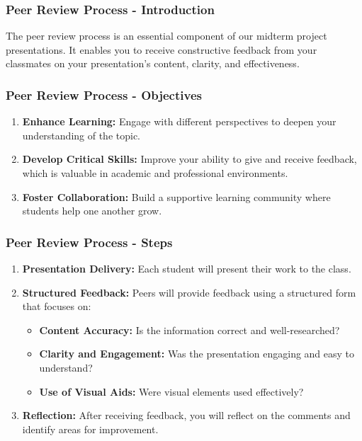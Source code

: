 \documentclass[aspectratio=169]{beamer}
\begin{document}
\begin{frame}[fragile]
    \frametitle{Peer Review Process - Introduction}
    The peer review process is an essential component of our midterm project presentations. It enables you to receive constructive feedback from your classmates on your presentation's content, clarity, and effectiveness.
\end{frame}

\begin{frame}[fragile]
    \frametitle{Peer Review Process - Objectives}
    \begin{enumerate}
        \item \textbf{Enhance Learning:} Engage with different perspectives to deepen your understanding of the topic.
        \item \textbf{Develop Critical Skills:} Improve your ability to give and receive feedback, which is valuable in academic and professional environments.
        \item \textbf{Foster Collaboration:} Build a supportive learning community where students help one another grow.
    \end{enumerate}
\end{frame}

\begin{frame}[fragile]
    \frametitle{Peer Review Process - Steps}
    \begin{enumerate}
        \item \textbf{Presentation Delivery:} Each student will present their work to the class.
        \item \textbf{Structured Feedback:} Peers will provide feedback using a structured form that focuses on:
        \begin{itemize}
            \item \textbf{Content Accuracy:} Is the information correct and well-researched?
            \item \textbf{Clarity and Engagement:} Was the presentation engaging and easy to understand?
            \item \textbf{Use of Visual Aids:} Were visual elements used effectively?
        \end{itemize}
        \item \textbf{Reflection:} After receiving feedback, you will reflect on the comments and identify areas for improvement.
    \end{enumerate}
\end{frame}
\end{document}
